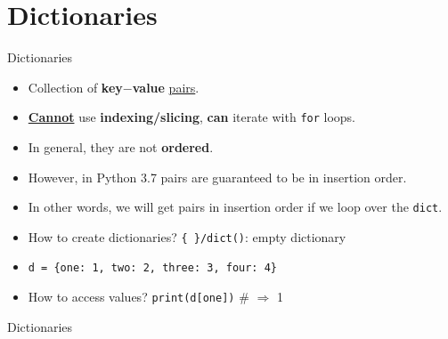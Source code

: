     \section{Dictionaries}
    \begin{frame}{Dictionaries}
        \LARGE
        \begin{itemize}
            \item Collection of \textbf{key$-$value} \underline{pairs}.
            \pause
            \item \underline{\textbf{Cannot}} use \textbf{indexing/slicing}, \textbf{can} iterate with \texttt{for} loops. 
            \pause
            \item In general, they are not \textbf{ordered}. 
            \pause
            \item However, in Python 3.7 pairs are guaranteed to be in insertion order.
            \pause
            \item In other words, we will get pairs in insertion order if we loop over the \texttt{dict}.
            \pause
            \item How to create dictionaries?
            \pause
             \texttt{\{\ \}/dict()}: empty dictionary
            \pause
            \item \texttt{d = \{\textquotesingle one\textquotesingle : 1, \textquotesingle two\textquotesingle : 2, \textquotesingle three\textquotesingle : 3, \textquotesingle four\textquotesingle : 4\}}
            \pause
            \item How to access values? 
            \pause
             \texttt{print(d[\textquotesingle one\textquotesingle ])} \# $\Rightarrow$ 1
        \end{itemize}
    \end{frame}

    \begin{frame}{Dictionaries}
        \large
        \inputminted[frame=single,framesep=2pt]{python3}{../Lecture5/code-examples/dicts.py}
    \end{frame}

